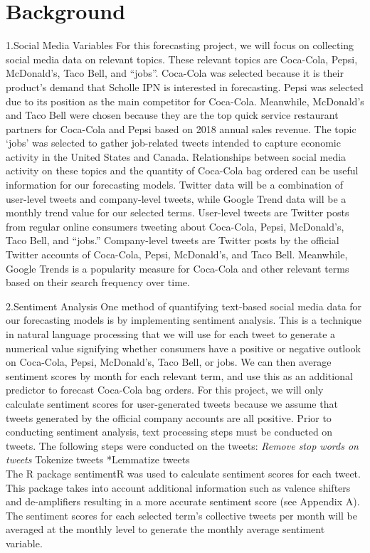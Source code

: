 \documentclass[12pt,oneside]{chicagocapstone}
\begin{document}
\chapter*{Background}\label{background}

1.Social Media Variables For this forecasting project, we will focus on
collecting social media data on relevant topics. These relevant topics
are Coca-Cola, Pepsi, McDonald's, Taco Bell, and ``jobs''. Coca-Cola was
selected because it is their product's demand that Scholle IPN is
interested in forecasting. Pepsi was selected due to its position as the
main competitor for Coca-Cola. Meanwhile, McDonald's and Taco Bell were
chosen because they are the top quick service restaurant partners for
Coca-Cola and Pepsi based on 2018 annual sales revenue. The topic `jobs'
was selected to gather job-related tweets intended to capture economic
activity in the United States and Canada. Relationships between social
media activity on these topics and the quantity of Coca-Cola bag ordered
can be useful information for our forecasting models. Twitter data will
be a combination of user-level tweets and company-level tweets, while
Google Trend data will be a monthly trend value for our selected terms.
User-level tweets are Twitter posts from regular online consumers
tweeting about Coca-Cola, Pepsi, McDonald's, Taco Bell, and ``jobs.''
Company-level tweets are Twitter posts by the official Twitter accounts
of Coca-Cola, Pepsi, McDonald's, and Taco Bell. Meanwhile, Google Trends
is a popularity measure for Coca-Cola and other relevant terms based on
their search frequency over time.

2.Sentiment Analysis One method of quantifying text-based social media
data for our forecasting models is by implementing sentiment analysis.
This is a technique in natural language processing that we will use for
each tweet to generate a numerical value signifying whether consumers
have a positive or negative outlook on Coca-Cola, Pepsi, McDonald's,
Taco Bell, or jobs. We can then average sentiment scores by month for
each relevant term, and use this as an additional predictor to forecast
Coca-Cola bag orders. For this project, we will only calculate sentiment
scores for user-generated tweets because we assume that tweets generated
by the official company accounts are all positive. Prior to conducting
sentiment analysis, text processing steps must be conducted on tweets.
The following steps were conducted on the tweets: \emph{Remove stop
words on tweets }Tokenize tweets *Lemmatize tweets\\
The R package sentimentR was used to calculate sentiment scores for each
tweet. This package takes into account additional information such as
valence shifters and de-amplifiers resulting in a more accurate
sentiment score (see Appendix A). The sentiment scores for each selected
term's collective tweets per month will be averaged at the monthly level
to generate the monthly average sentiment variable.
\end{document}
